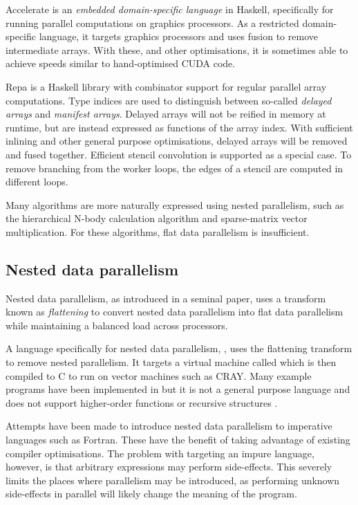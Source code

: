 Accelerate is an \emph{embedded domain-specific language} in Haskell, specifically for running parallel computations on graphics processors.
As a restricted domain-specific language, it targets graphics processors\cite{chakravarty2011accelerating} and uses fusion to remove intermediate arrays.
With these, and other optimisations, it is sometimes able to achieve speeds similar to hand-optimised CUDA code\cite{mcdonell2013optimising}.

Repa is a Haskell library with combinator support for regular parallel array computations\cite{keller2010regular}.
Type indices are used to distinguish between so-called \emph{delayed arrays} and \emph{manifest arrays}.
Delayed arrays will not be reified in memory at runtime, but are instead expressed as functions of the array index.
With sufficient inlining and other general purpose optimisations, delayed arrays will be removed and fused together\cite{lippmeier2012guiding}.
Efficient stencil convolution is supported as a special case.
To remove branching from the worker loops, the edges of a stencil are computed in different loops\cite{lippmeier2011efficient}.

Many algorithms are more naturally expressed using nested parallelism, such as the hierarchical N-body calculation\cite{barnes1986hierarchical} algorithm and sparse-matrix vector multiplication.
For these algorithms, flat data parallelism is insufficient.


\subsection{Nested data parallelism}
Nested data parallelism, as introduced in a seminal paper\cite{blelloch1990vector},
uses a transform known as \emph{flattening} to convert nested data parallelism into flat data parallelism
while maintaining a balanced load across processors.

A language specifically for nested data parallelism, \nesl\cite{blelloch1995nesl},
uses the flattening transform to remove nested parallelism.
It targets a virtual machine called \vcode\cite{blelloch1993implementation}
which is then compiled to C to run on vector machines such as CRAY.
Many example programs have been implemented in \nesl\cite{blelloch1996programming}
but it is not a general purpose language and does not support higher-order functions\cite{leshchinskiy2005higher} or recursive structures \cite{keller1998flattening}.

Attempts have been made to introduce nested data parallelism to imperative languages such as Fortran\cite{au1997enlarging}.
These have the benefit of taking advantage of existing compiler optimisations.
The problem with targeting an impure language, however,
is that arbitrary expressions may perform side-effects.
This severely limits the places where parallelism may be introduced, as performing unknown side-effects in parallel will likely change the meaning of the program.

